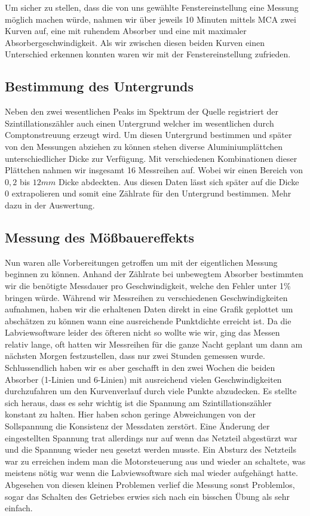 \documentclass[12pt]{article}
\begin{document}
Um sicher zu stellen, dass die von uns gewählte Fenstereinstellung eine Messung möglich machen würde, nahmen wir über jeweils 10 Minuten mittels MCA zwei Kurven auf, eine mit
ruhendem Absorber und eine mit maximaler Absorbergeschwindigkeit. Als wir zwischen diesen beiden Kurven einen Unterschied erkennen konnten waren wir mit der Fenstereinstellung zufrieden.

\subsection{Bestimmung des Untergrunds}
Neben den zwei wesentlichen Peaks im Spektrum der Quelle registriert der Szintillationszähler auch einen Untergrund welcher im wesentlichen durch Comptonstreuung erzeugt wird. Um diesen
Untergrund bestimmen und später von den Messungen abziehen zu können stehen diverse Aluminiumplättchen unterschiedlicher Dicke zur Verfügung. Mit verschiedenen Kombinationen dieser Plättchen nahmen wir
insgesamt 16 Messreihen auf. Wobei wir einen Bereich von $0,2$ bis $12 mm$ Dicke abdeckten. Aus diesen Daten lässt sich später auf die Dicke $0$ extrapolieren und somit eine Zählrate für
den Untergrund bestimmen. Mehr dazu in der Auswertung.

\subsection{Messung des Mößbauereffekts}
Nun waren alle Vorbereitungen getroffen um mit der eigentlichen Messung beginnen zu können. Anhand der Zählrate bei unbewegtem Absorber bestimmten wir die benötigte Messdauer pro Geschwindigkeit,
welche den Fehler unter 1\% bringen würde. Während wir Messreihen zu verschiedenen Geschwindigkeiten aufnahmen, haben wir die erhaltenen Daten direkt in eine Grafik geplottet um abschätzen
zu können wann eine ausreichende Punktdichte erreicht ist. Da die Labviewsoftware leider des öfteren nicht so wollte wie wir, ging das Messen relativ lange, oft hatten wir Messreihen für die ganze
Nacht geplant um dann am nächsten Morgen festzustellen, dass nur zwei Stunden gemessen wurde. Schlussendlich haben wir es aber geschafft in den zwei Wochen die beiden Absorber (1-Linien und 6-Linien)
mit ausreichend
 vielen Geschwindigkeiten durchzufahren um den Kurvenverlauf durch viele Punkte abzudecken. Es stellte sich heraus, dass es sehr wichtig ist die Spannung am Szintillationszähler konstant
zu halten. Hier haben schon geringe Abweichungen von der Sollspannung die Konsistenz der Messdaten zerstört. Eine Änderung der eingestellten Spannung trat allerdings nur auf wenn das Netzteil
abgestürzt war und die Spannung wieder neu gesetzt werden musste. Ein Absturz des Netzteils war zu erreichen indem man die Motorsteuerung aus und wieder an schaltete, was meistens nötig war
wenn die Labviewsoftware sich mal wieder aufgehängt hatte. Abgesehen von diesen kleinen Problemen verlief die Messung sonst Problemlos, sogar das Schalten des Getriebes erwies sich nach ein bisschen
Übung als sehr einfach.
\end{document}
